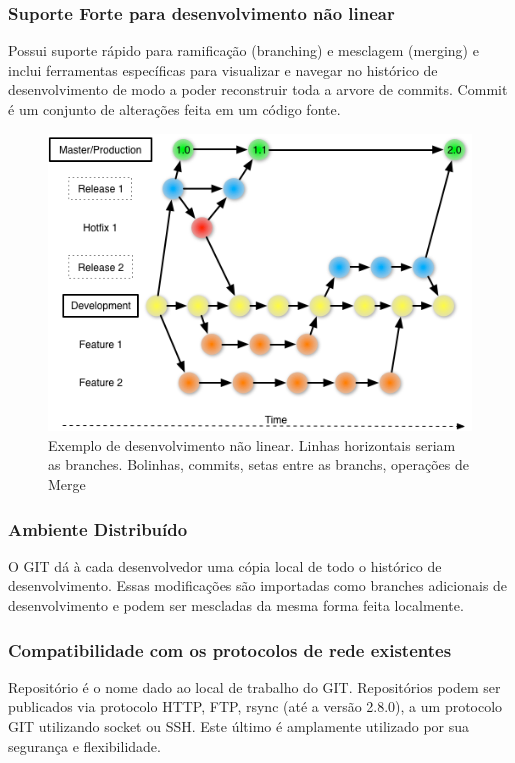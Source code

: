 \documentclass[
	article,			%
	12pt,				%
	oneside,			%
	a4paper,			%
	english,			
	brazil,
	sumario=tradicional
	]{abntex2}
\begin{document}
\subsubsection{Suporte Forte para desenvolvimento não linear}
Possui suporte rápido para ramificação (branching) e mesclagem (merging) e inclui ferramentas específicas para visualizar e navegar no histórico de desenvolvimento de modo a poder reconstruir toda a arvore de commits. Commit é um conjunto de alterações feita em um código fonte.

\begin{figure}[!h]
\centering
\includegraphics[scale=0.5]{images/git_workflow.png}
\caption{Exemplo de desenvolvimento não linear. Linhas horizontais seriam as branches. Bolinhas, commits, setas entre as branchs, operações de Merge}
\label{img_git_workflow}
\end{figure}

\subsubsection{Ambiente Distribuído}

O GIT dá à cada desenvolvedor uma cópia local de todo o histórico de desenvolvimento. Essas modificações são importadas como branches adicionais de desenvolvimento e podem ser mescladas da mesma forma feita localmente.

\subsubsection{Compatibilidade com os protocolos de rede existentes}
Repositório é o nome dado ao local de trabalho do GIT. Repositórios podem ser publicados via protocolo HTTP, FTP, rsync (até a versão 2.8.0), a um protocolo GIT utilizando socket ou SSH. Este último é amplamente utilizado por sua segurança e flexibilidade.
\end{document}
